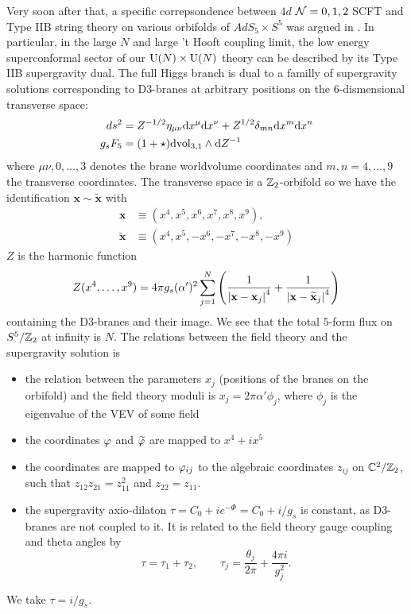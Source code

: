     Very soon after that, a specific correpsondence between $4d$ $\mathcal{N}=0,1,2$ SCFT and Type IIB string theory on various orbifolds of $AdS_5\times S^5$ was argued in \cite{silervstein1998}. In particular, in the large $N$ and large 't Hooft coupling limit, the low energy superconformal sector of our $\text{U}(N)\times\text{U}(N)$ theory can be described by its Type IIB supergravity dual. The full Higgs branch is dual to a familly of supergravity solutions corresponding to D$3$-branes at arbitrary positions on the $6$-dismensional transverse space:
    \begin{align}
        ds^2 &= Z^{-1/2}\eta_{\mu\nu}\text{d} x^\mu\text{d} x^\nu+Z^{1/2}\delta_{mn}\text{d} x^m\text{d} x^n\\
        g_s F_5 &= (1+\star)\text{d}\text{vol}_{3,1}\wedge\text{d} Z^{-1}
    \end{align}
    where $\mu\nu,0,\dots,3$ denotes the brane worldvolume coordinates and $m,n=4,\dots,9$ the transverse coordinates. The transverse space is a $\mathbb{Z}_2$-orbifold so we have the identification $\textbf{x}\sim\tilde{\textbf{x}}$ with
    \begin{align*}
        \textbf{x} &\equiv (x^4,x^5,x^6,x^7,x^8,x^9),\\
        \tilde{\textbf{x}} &\equiv (x^4,x^5,-x^6,-x^7,-x^8,-x^9)
    \end{align*}
    $Z$ is the harmonic function
    \begin{equation}
        Z(x^4,\dots,x^9)=4\pi g_s(\alpha')^2\sum^N_{j=1}\left( \frac{1}{\abs{\textbf{x}-\textbf{x}_j}^4}+\frac{1}{\abs{\textbf{x}-\widetilde{\textbf{x}}_j}^4} \right)
    \end{equation}
    containing the D$3$-branes and their image. We see that the total $5$-form flux on $S^5/\mathbb{Z}_2$ at infinity is $N$. The relations between the field theory and the supergravity solution is
    \begin{itemize}
        \item the relation between the parameters $x_j$ (positions of the branes on the orbifold) and the field theory moduli is $x_j=2\pi\alpha'\phi_j$, where $\phi_j$ is the eigenvalue of the VEV of some field
        \item the coordinates $\varphi$ and $\widetilde{\varphi}$ are mapped to $x^4+i x^5$
        \item the coordinates are mapped to $\varphi_{ij}$ to the algebraic coordinates $z_{ij}$ on $\mathbb{C}^2/\mathbb{Z}_2$, such that $z_{12}z_{21}=z^2_{11}$ and $z_{22}=z_{11}$.
        \item the supergravity axio-dilaton $\tau=C_0+ie^{-\Phi}=C_0+i/g_s$ is constant, as D$3$-branes are not coupled to it. It is related to the field theory gauge coupling and theta angles by
        \begin{equation}
            \tau = \tau_1+\tau_2, \qquad \tau_j = \frac{\theta_j}{2\pi}+\frac{4\pi i}{g^2_j}.
        \end{equation}
    \end{itemize}
    We take $\tau=i/g_s$.

